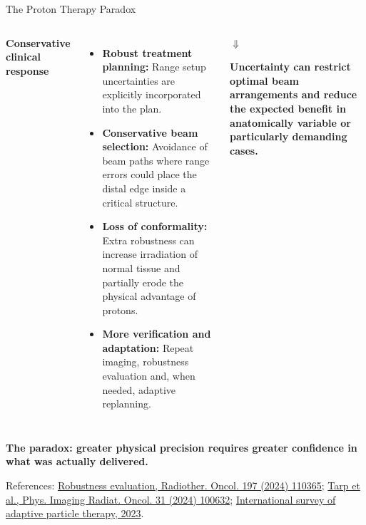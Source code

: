\documentclass[aspectratio=169,11pt]{beamer}
\begin{document}
\begin{frame}{The Proton Therapy Paradox}
\begin{columns}[T,onlytextwidth]

{\normalsize\bfseries\color{PTblue}
Conservative clinical response
}

\vspace{0.30cm}

{\tiny
\begin{itemize}
    \item \textbf{Robust treatment planning:} Range setup uncertainties are explicitly incorporated into the plan.
    \item \textbf{Conservative beam selection:} Avoidance of beam paths where range errors could place the distal edge
inside a critical structure.
    \item \textbf{Loss of conformality:} Extra robustness can increase irradiation of normal tissue and partially erode the physical advantage of protons.
    \item\textbf{More verification and adaptation:} Repeat imaging, robustness evaluation and, when needed, adaptive replanning.

\end{itemize}
}
\begin{center}
{\Large\bfseries\color{PTred}
$\Downarrow$
}

\vspace{0.08cm}

{\scriptsize\bfseries\color{PTred}
Uncertainty can restrict optimal beam arrangements and reduce the expected benefit in anatomically variable or particularly demanding cases.
}
\end{center}

\end{columns}

\vfill

\begin{center}
{\large\bfseries\color{PTred}
The paradox: greater physical precision requires greater confidence in what was actually delivered.
}
\end{center}

\vspace{0.08cm}

{\tiny\color{PTgray}
References:
\href{https://doi.org/10.1016/j.radonc.2024.110365}
{Robustness evaluation, Radiother. Oncol. 197 (2024) 110365};
\href{https://doi.org/10.1016/j.phro.2024.100632}
{Tarp et al., Phys. Imaging Radiat. Oncol. 31 (2024) 100632};
\href{https://doi.org/10.1016/j.phro.2023.100412}
{International survey of adaptive particle therapy, 2023}.
}

\end{frame}
\end{document}
